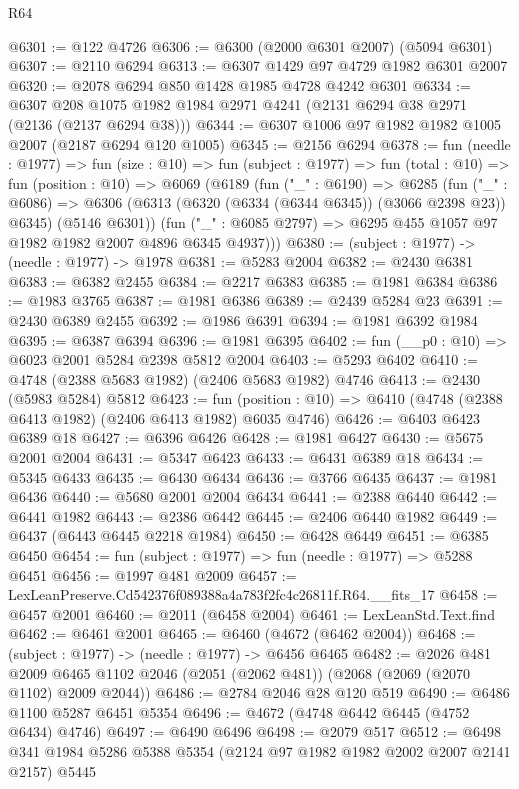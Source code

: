 \begin{lexlean}{R64}
\begin{coremodule}
@6301 := @122 @4726
@6306 := @6300 (@2000 @6301 @2007) (@5094 @6301)
@6307 := @2110 @6294
@6313 := @6307 @1429 @97 @4729 @1982 @6301 @2007
@6320 := @2078 @6294 @850 @1428 @1985 @4728 @4242 @6301
@6334 := @6307 @208 @1075 @1982 @1984 @2971 @4241 (@2131 @6294 @38 @2971 (@2136 (@2137 @6294 @38)))
@6344 := @6307 @1006 @97 @1982 @1982 @1005 @2007 (@2187 @6294 @120 @1005)
@6345 := @2156 @6294
@6378 := fun (needle : @1977) =>
  fun (size : @10) =>
  fun (subject : @1977) =>
  fun (total : @10) =>
  fun (position : @10) =>
  @6069
    (@6189
      (fun ("_" : @6190) =>
      @6285
        (fun ("_" : @6086) =>
        @6306 (@6313 (@6320 (@6334 (@6344 @6345)) (@3066 @2398 @23)) @6345) (@5146 @6301))
        (fun ("_" : @6085 @2797) => @6295 @455 @1057 @97 @1982 @1982 @2007 @4896 @6345 @4937)))
@6380 := (subject : @1977) -> (needle : @1977) -> @1978
@6381 := @5283 @2004
@6382 := @2430 @6381
@6383 := @6382 @2455
@6384 := @2217 @6383
@6385 := @1981 @6384
@6386 := @1983 @3765
@6387 := @1981 @6386
@6389 := @2439 @5284 @23
@6391 := @2430 @6389 @2455
@6392 := @1986 @6391
@6394 := @1981 @6392 @1984
@6395 := @6387 @6394
@6396 := @1981 @6395
@6402 := fun (__p0 : @10) => @6023 @2001 @5284 @2398 @5812 @2004
@6403 := @5293 @6402
@6410 := @4748 (@2388 @5683 @1982) (@2406 @5683 @1982) @4746
@6413 := @2430 (@5983 @5284) @5812
@6423 := fun (position : @10) => @6410 (@4748 (@2388 @6413 @1982) (@2406 @6413 @1982) @6035 @4746)
@6426 := @6403 @6423 @6389 @18
@6427 := @6396 @6426
@6428 := @1981 @6427
@6430 := @5675 @2001 @2004
@6431 := @5347 @6423
@6433 := @6431 @6389 @18
@6434 := @5345 @6433
@6435 := @6430 @6434
@6436 := @3766 @6435
@6437 := @1981 @6436
@6440 := @5680 @2001 @2004 @6434
@6441 := @2388 @6440
@6442 := @6441 @1982
@6443 := @2386 @6442
@6445 := @2406 @6440 @1982
@6449 := @6437 (@6443 @6445 @2218 @1984)
@6450 := @6428 @6449
@6451 := @6385 @6450
@6454 := fun (subject : @1977) => fun (needle : @1977) => @5288 @6451
@6456 := @1997 @481 @2009
@6457 := LexLeanPreserve.Cd542376f089388a4a783f2fc4c26811f.R64.__fits_17
@6458 := @6457 @2001
@6460 := @2011 (@6458 @2004)
@6461 := LexLeanStd.Text.find
@6462 := @6461 @2001
@6465 := @6460 (@4672 (@6462 @2004))
@6468 := (subject : @1977) -> (needle : @1977) -> @6456 @6465
@6482 := @2026
    @481
    @2009
    @6465
    @1102
    @2046
    (@2051 (@2062 @481))
    (@2068 (@2069 (@2070 @1102) @2009 @2044))
@6486 := @2784 @2046 @28 @120 @519
@6490 := @6486 @1100 @5287 @6451 @5354
@6496 := @4672 (@4748 @6442 @6445 (@4752 @6434) @4746)
@6497 := @6490 @6496
@6498 := @2079 @517
@6512 := @6498 @341 @1984 @5286 @5388 @5354 (@2124 @97 @1982 @1982 @2002 @2007 @2141 @2157) @5445

\end{coremodule}
\end{lexlean}
